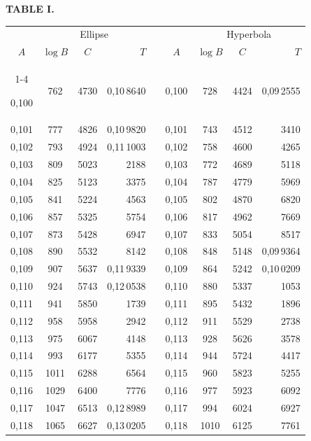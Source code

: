 \endgroup
\clearpage
{}
\begingroup
\centering
\fontsize{9}{9}\selectfont
\setlength{\tabcolsep}{6pt}
\renewcommand{\arraystretch}{1}
\setlength{\parskip}{0pt}
\textbf{TABLE I.}
\par\vspace{7pt}
\begin{tabular}{|c|c|c|r|@{}p{9pt}@{}|c|c|c|r|}
\hline
\rule{0pt}{8.5pt} & \multicolumn{3}{c|}{Ellipse} & & & \multicolumn{3}{c|}{Hyperbola} \\
\(A\) & \(\log B\) & \(C\) & \(T\) & & \(A\) & \(\log B\) & \(C\) & \(T\) \\
\cline{1-4}\cline{6-9}
\rule{0pt}{8.5pt}0,100 & 762 & 4730 & 0,10\,8640 &  & 0,100 & 728 & 4424 & 0,09\,2555 \\
0,101 & 777 & 4826 & 0,10\,9820 &  & 0,101 & 743 & 4512 & 3410 \\
0,102 & 793 & 4924 & 0,11\,1003 &  & 0,102 & 758 & 4600 & 4265 \\
0,103 & 809 & 5023 & 2188 &  & 0,103 & 772 & 4689 & 5118 \\
0,104 & 825 & 5123 & 3375 &  & 0,104 & 787 & 4779 & 5969 \\
0,105 & 841 & 5224 & 4563 &  & 0,105 & 802 & 4870 & 6820 \\[3pt]
0,106 & 857 & 5325 & 5754 &  & 0,106 & 817 & 4962 & 7669 \\
0,107 & 873 & 5428 & 6947 &  & 0,107 & 833 & 5054 & 8517 \\
0,108 & 890 & 5532 & 8142 &  & 0,108 & 848 & 5148 & 0,09\,9364 \\
0,109 & 907 & 5637 & 0,11\,9339 &  & 0,109 & 864 & 5242 & 0,10\,0209 \\
0,110 & 924 & 5743 & 0,12\,0538 &  & 0,110 & 880 & 5337 & 1053 \\[3pt]
0,111 & 941 & 5850 & 1739 &  & 0,111 & 895 & 5432 & 1896 \\
0,112 & 958 & 5958 & 2942 &  & 0,112 & 911 & 5529 & 2738 \\
0,113 & 975 & 6067 & 4148 &  & 0,113 & 928 & 5626 & 3578 \\
0,114 & 993 & 6177 & 5355 &  & 0,114 & 944 & 5724 & 4417 \\
0,115 & 1011 & 6288 & 6564 &  & 0,115 & 960 & 5823 & 5255 \\[3pt]
0,116 & 1029 & 6400 & 7776 &  & 0,116 & 977 & 5923 & 6092 \\
0,117 & 1047 & 6513 & 0,12\,8989 &  & 0,117 & 994 & 6024 & 6927 \\
0,118 & 1065 & 6627 & 0,13\,0205 &  & 0,118 & 1010 & 6125 & 7761 \\

\end{tabular}
